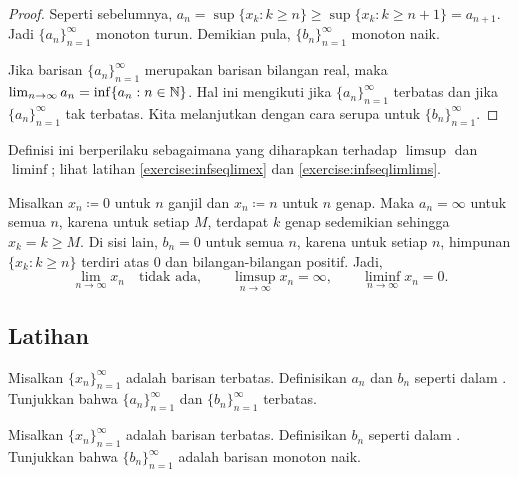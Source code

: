 \begin{proof}
Seperti sebelumnya,
$a_n = \sup \{ x_k : k \geq n \} \geq \sup \{ x_k : k \geq n+1 \} =
a_{n+1}$.  Jadi $\{ a_n \}_{n=1}^\infty$ monoton turun. Demikian pula,
$\{ b_n \}_{n=1}^\infty$ monoton naik.

Jika barisan $\{ a_n \}_{n=1}^\infty$ merupakan barisan bilangan real, maka
$\lim_{n\to\infty} a_n = \inf \{ a_n : n \in {\mathbb{N}} \}$.  Hal ini mengikuti
 jika $\{ a_n \}_{n=1}^\infty$ terbatas dan
 jika $\{a_n \}_{n=1}^\infty$
tak terbatas.  Kita melanjutkan dengan cara serupa untuk $\{ b_n \}_{n=1}^\infty$.
\end{proof}

Definisi ini berperilaku sebagaimana yang diharapkan terhadap
$\limsup$ dan $\liminf$; lihat latihan \ref{exercise:infseqlimex}
dan \ref{exercise:infseqlimlims}.

\begin{example}
Misalkan
$x_n \coloneqq 0$ untuk $n$ ganjil dan $x_n \coloneqq n$ untuk $n$ genap.
Maka $a_n = \infty$ untuk semua $n$, karena untuk setiap $M$,
terdapat $k$ genap sedemikian sehingga $x_k = k \geq M$.
Di sisi lain, $b_n = 0$ untuk semua $n$, karena
untuk setiap $n$, himpunan
$\{ x_k : k \geq n \}$ terdiri atas $0$ dan bilangan-bilangan positif.
Jadi,
\begin{equation*}
\lim_{n\to \infty} x_n \quad \text{tidak ada},
\qquad
\limsup_{n\to \infty} x_n = \infty ,
\qquad
\liminf_{n\to \infty} x_n = 0.
\end{equation*}
\end{example}

\subsection{Latihan}

\begin{exercise}
Misalkan $\{ x_n \}_{n=1}^\infty$ adalah barisan terbatas.  Definisikan $a_n$ dan
$b_n$ seperti dalam .  Tunjukkan bahwa $\{ a_n \}_{n=1}^\infty$
dan $\{ b_n \}_{n=1}^\infty$ terbatas.
\end{exercise}

\begin{exercise}
Misalkan $\{ x_n \}_{n=1}^\infty$ adalah barisan terbatas.
Definisikan $b_n$ seperti dalam .  Tunjukkan bahwa
$\{ b_n \}_{n=1}^\infty$ adalah barisan monoton naik.
\end{exercise}

